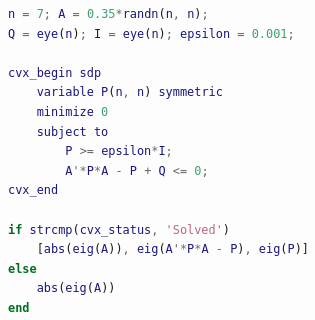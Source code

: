 \begin{lstlisting}[language=Matlab]
n = 7; A = 0.35*randn(n, n);
Q = eye(n); I = eye(n); epsilon = 0.001;

cvx_begin sdp
    variable P(n, n) symmetric
    minimize 0
    subject to
        P >= epsilon*I;
        A'*P*A - P + Q <= 0;
cvx_end

if strcmp(cvx_status, 'Solved')
    [abs(eig(A)), eig(A'*P*A - P), eig(P)]
else
    abs(eig(A))
end
\end{lstlisting}